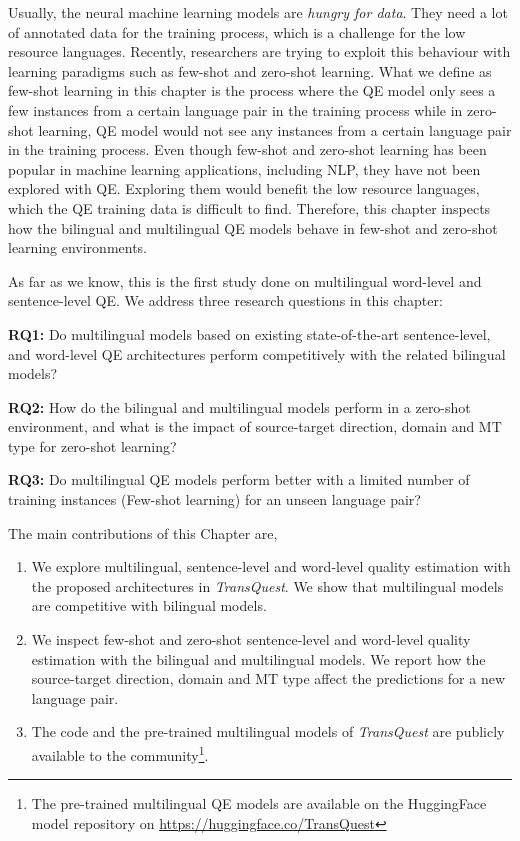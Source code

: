 Usually, the neural machine learning models are \textit{hungry for data}. They need a lot of annotated data for the training process, which is a challenge for the low resource languages. Recently, researchers are trying to exploit this behaviour with learning paradigms such as few-shot and zero-shot learning.  What we define as few-shot learning in this chapter is the process where the QE model only sees a few instances from a certain language pair in the training process \autocite{10.1145/3386252} while in zero-shot learning, QE model would not see any instances from a certain language pair \autocite{10.5555/1620163.1620201} in the training process. Even though few-shot and zero-shot learning has been popular in machine learning applications, including NLP, they have not been explored with QE. Exploring them would benefit the low resource languages, which the QE training data is difficult to find. Therefore, this chapter inspects how the bilingual and multilingual QE models behave in few-shot and zero-shot learning environments.


As far as we know, this is the first study done on multilingual word-level and sentence-level QE. We address three research questions in this chapter:

\textbf{RQ1:} Do multilingual models based on existing state-of-the-art sentence-level, and word-level QE architectures perform competitively with the related bilingual models?

\textbf{RQ2:} How do the bilingual and multilingual models perform in a zero-shot environment, and what is the impact of source-target direction, domain and MT type for zero-shot learning?

\textbf{RQ3:} Do multilingual QE models perform better with a limited number of training instances (Few-shot learning) for an unseen language pair?


The main contributions of this Chapter are, 

\begin{enumerate}

\item We explore multilingual, sentence-level and word-level quality estimation with the proposed architectures in \textit{TransQuest}. We show that multilingual models are competitive with bilingual models.

\item We inspect few-shot and zero-shot sentence-level and word-level quality estimation with the bilingual and multilingual models. We report how the source-target direction, domain and MT type affect the predictions for a new language pair.

\item The code and the pre-trained multilingual models of \textit{TransQuest} are publicly available to the community\footnote{The pre-trained multilingual QE models are available on the HuggingFace model repository on \url{https://huggingface.co/TransQuest}}.

\end{enumerate} 

